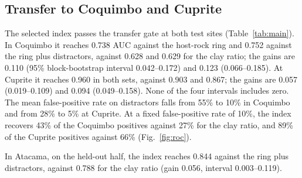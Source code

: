 \documentclass[preprint,authoryear,number]{elsarticle}
\begin{document}
\subsection{Transfer to Coquimbo and Cuprite}
\label{sec:transfer}

The selected index passes the transfer gate at both test sites (Table~\ref{tab:main}). In Coquimbo it reaches 0.738 AUC against the host-rock ring and 0.752 against the ring plus distractors, against 0.628 and 0.629 for the clay ratio; the gains are 0.110 (95\% block-bootstrap interval 0.042--0.172) and 0.123 (0.066--0.185). At Cuprite it reaches 0.960 in both sets, against 0.903 and 0.867; the gains are 0.057 (0.019--0.109) and 0.094 (0.049--0.158). None of the four intervals includes zero. The mean false-positive rate on distractors falls from 55\% to 10\% in Coquimbo and from 28\% to 5\% at Cuprite. At a fixed false-positive rate of 10\%, the index recovers 43\% of the Coquimbo positives against 27\% for the clay ratio, and 89\% of the Cuprite positives against 66\% (Fig.~\ref{fig:roc}).

In Atacama, on the held-out half, the index reaches 0.844 against the ring plus distractors, against 0.788 for the clay ratio (gain 0.056, interval 0.003--0.119).
\end{document}
